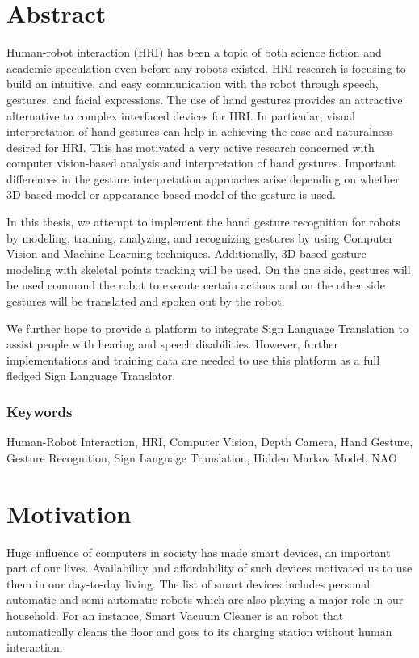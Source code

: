 \chapter{Abstract}
Human-robot interaction (HRI) has been a topic of both science fiction and academic speculation even before any robots existed\cite{7}. HRI research is focusing to build an intuitive, and easy communication with the robot through speech, gestures, and facial expressions. The use of hand gestures provides an attractive alternative to complex interfaced devices for HRI. In particular, visual interpretation of hand gestures can help in achieving the ease and naturalness desired for HRI. This has motivated a very active research concerned with computer vision-based analysis and interpretation of hand gestures. Important differences in the gesture interpretation approaches arise depending on whether 3D based model or appearance based model of the gesture is used. 

In this thesis, we attempt to implement the hand gesture recognition for robots by modeling, training, analyzing, and recognizing gestures by using Computer Vision and Machine Learning techniques. Additionally, 3D based gesture modeling with skeletal points tracking will be used. On the one side, gestures will be used command the robot to execute certain actions and on the other side gestures will be translated and spoken out by the robot.

We further hope to provide a platform to integrate Sign Language Translation to assist people with hearing and speech disabilities. However, further implementations and training data are needed to use this platform as a full fledged Sign Language Translator.

\subsection*{Keywords} Human-Robot Interaction, HRI, Computer Vision, Depth Camera, Hand Gesture, Gesture Recognition, Sign Language Translation, Hidden Markov Model, NAO

\chapter{Motivation} Huge influence of computers in society has made smart devices, an important part of our lives. Availability and affordability of such devices motivated us to use them in our day-to-day living. The list of smart devices includes personal automatic and semi-automatic robots which are also playing a major role in our household. For an instance, Smart Vacuum Cleaner is an robot that automatically cleans the floor and goes to its charging station without human interaction.

